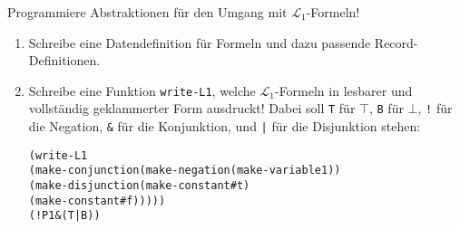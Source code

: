 \begin{aufgabe}\label{ex:sc1-scheme}
  Programmiere Abstraktionen für den Umgang mit
  $\mathcal{L}_1$-Formeln!
  \begin{enumerate}
  \item Schreibe eine Datendefinition für Formeln und dazu passende
    Record-Definitionen.
  \item Schreibe eine Funktion \texttt{write-L1}, welche
    $\mathcal{L}_1$-Formeln in lesbarer und vollständig geklammerter
    Form ausdruckt!  Dabei soll \texttt{T} für $\top$, \texttt{B} für
    $\bot$, \texttt{!} für die
    Negation, \texttt{\&} für die Konjunktion, und \verb&|& für die
    Disjunktion stehen:
\begin{alltt}
(write-L1
 (make-conjunction (make-negation (make-variable 1))
                   (make-disjunction (make-constant #t)
                                     (make-constant #f)))))
\prints{} (!P1&(T|B))
\end{alltt}
  \end{enumerate}
\end{aufgabe}


